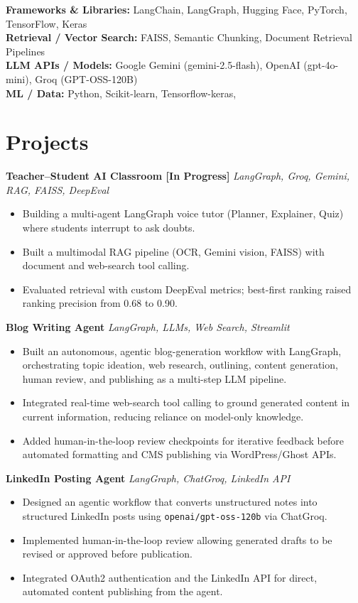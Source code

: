 \documentclass[10pt,letterpaper]{article}
\newcommand{\resumeProject}[2]{
    \textbf{#1} \hfill \textit{#2}
}
\newcommand{\resumeItem}[1]{
    \item #1
}
\begin{document}
 \textbf{Frameworks \& Libraries:} LangChain, LangGraph, Hugging Face, PyTorch, TensorFlow, Keras \\
 \textbf{Retrieval / Vector Search:} FAISS, Semantic Chunking, Document Retrieval Pipelines \\
 \textbf{LLM APIs / Models:} Google Gemini (gemini-2.5-flash), OpenAI (gpt-4o-mini), Groq (GPT-OSS-120B) \\

\textbf{ML / Data:}  Python, Scikit-learn, Tensorflow-keras,

\section*{Projects}

\resumeProject{Teacher--Student AI Classroom [In Progress]}{LangGraph, Groq, Gemini, RAG, FAISS, DeepEval}

\begin{itemize}
    \resumeItem{Building a multi-agent LangGraph voice tutor (Planner, Explainer, Quiz) where students interrupt to ask doubts.}
    \resumeItem{Built a multimodal RAG pipeline (OCR, Gemini vision, FAISS) with document and web-search tool calling.}
    \resumeItem{Evaluated retrieval with custom DeepEval metrics; best-first ranking raised ranking precision from 0.68 to 0.90.}
\end{itemize}

\resumeProject{Blog Writing Agent}{LangGraph, LLMs, Web Search, Streamlit}

\begin{itemize}
    \resumeItem{Built an autonomous, agentic blog-generation workflow with LangGraph, orchestrating topic ideation, web research, outlining, content generation, human review, and publishing as a multi-step LLM pipeline.}
    \resumeItem{Integrated real-time web-search tool calling to ground generated content in current information, reducing reliance on model-only knowledge.}
    \resumeItem{Added human-in-the-loop review checkpoints for iterative feedback before automated formatting and CMS publishing via WordPress/Ghost APIs.}
\end{itemize}


\resumeProject{LinkedIn Posting Agent}{LangGraph, ChatGroq, LinkedIn API}

\begin{itemize}
    \resumeItem{Designed an agentic workflow that converts unstructured notes into structured LinkedIn posts using \texttt{openai/gpt-oss-120b} via ChatGroq.}
    \resumeItem{Implemented human-in-the-loop review allowing generated drafts to be revised or approved before publication.}
    \resumeItem{Integrated OAuth2 authentication and the LinkedIn API for direct, automated content publishing from the agent.}
\end{itemize}
\end{document}
